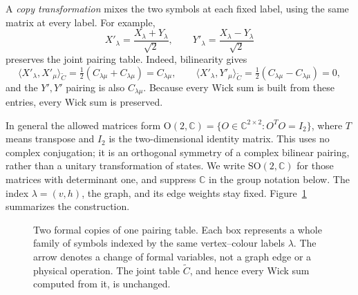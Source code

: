 \documentclass[11pt]{article}
\theoremstyle{definition}
\theoremstyle{plain}
\numberwithin{equation}{section}
\begin{document}
A \emph{copy transformation} mixes the two symbols at each fixed label,
using the same matrix at every label. For example,
\[
 X'_\lambda=\frac{X_\lambda+Y_\lambda}{\sqrt2},\qquad
 Y'_\lambda=\frac{X_\lambda-Y_\lambda}{\sqrt2}
\]
preserves the joint pairing table. Indeed, bilinearity gives
\[
 \langle X'_\lambda,X'_\mu\rangle_{\widetilde C}
   =\tfrac12(C_{\lambda\mu}+C_{\lambda\mu})=C_{\lambda\mu},
 \qquad
 \langle X'_\lambda,Y'_\mu\rangle_{\widetilde C}
   =\tfrac12(C_{\lambda\mu}-C_{\lambda\mu})=0,
\]
and the \(Y',Y'\) pairing is also \(C_{\lambda\mu}\). Because every
Wick sum is built from these entries, every Wick sum is preserved.

In general the allowed matrices form
\(\mathrm O(2,\mathbb C)=\{O\in\mathbb C^{2\times2}:O^TO=I_2\}\),
where \(T\) means transpose and \(I_2\) is the two-dimensional identity
matrix. This uses no complex conjugation; it is an orthogonal symmetry of
a complex bilinear pairing, rather than a unitary transformation of states.
We write \(\mathrm{SO}(2,\mathbb C)\) for those matrices with determinant
one, and suppress \(\mathbb C\) in the group notation below.
The index \(\lambda=(v,h)\), the graph, and its edge weights stay fixed.
Figure~\ref{fig:copies} summarizes the construction.

\begin{figure}[htbp]
\centering
{}
\caption{Two formal copies of one pairing table. Each box represents a
whole family of symbols indexed by the same vertex--colour labels
\(\lambda\). The arrow denotes a change of formal variables, not a graph
edge or a physical operation. The joint table \(\widetilde C\), and hence
every Wick sum computed from it, is unchanged.}
\label{fig:copies}
\end{figure}
\end{document}
